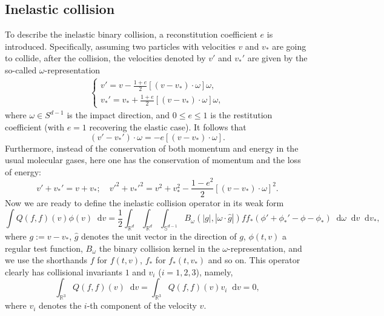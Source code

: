 \documentclass[review, times]{elsarticle}
\newcommand*\diff{\mathop{}\!\mathrm{d}}
\begin{document}
\subsection{Inelastic collision }
To describe the inelastic binary collision, a reconstitution coefficient $e$ is introduced. Specifically, assuming two particles with velocities $v$ and $v_*$ are going to collide, after the collision, the velocities denoted by $v'$ and $v_*'$ are given by the so-called $\omega$-representation \cite{vilani} 
\begin{align}\label{omega}
\left\{
\begin{array}{l}
\displaystyle v'=v-\frac{1+e}{2}[(v-v_*)\cdot \omega ]\omega, \\[8pt]
\displaystyle v_*'=v_*+\frac{1+e}{2}[(v-v_*)\cdot \omega]\omega,
\end{array}\right.
\end{align}
where $\omega \in S^{d-1}$ is the impact direction, and $0 \leq e \leq 1$ is the restitution coefficient (with $e=1$ recovering the elastic case). It follows that
\begin{equation}
(v'-v_*')\cdot \omega=-e [(v-v_*)\cdot \omega].
\end{equation}
Furthermore, instead of the conservation of both momentum and energy in the usual molecular gases, here one has the conservation of momentum and the loss of energy:
\begin{equation} \label{lossenergy}
v'+v_*'=v+v_*; \quad v'^2+v_*'^2=v^2+v_*^2-\frac{1-e^2}{2}[(v-v_*)\cdot \omega]^2.
\end{equation}
Now we are ready to define the inelastic collision operator in its weak form
\begin{equation} \label{col_omega}
\int Q(f,f)(v)\phi(v)\diff{v}= \frac{1}{2} \int_{\mathbb{R}^d} \int_{\mathbb{R}^d} \int_{\mathbb{S}^{d-1}} B_{\omega}(|g|,|\omega\cdot \hat{g}|)ff_*\left(\phi'+\phi_*'-\phi-\phi_* \right)\diff{\omega} \diff{v} \diff{v_*},
\end{equation}
where $g := v - v_\ast$, $\hat{g}$ denotes the unit vector in the direction of $g$, $\phi(t,v)$ a regular test function, $B_{\omega}$ the binary collision kernel in the $\omega$-representation, and we use the shorthands $f$ for $f(t,v)$, $f_\ast$ for $f_\ast(t, v_\ast)$ and so on. This operator clearly has collisional invariants $1$ and $v_i$ ($i = 1, 2, 3$), namely,
\begin{equation}
  \int_{\mathbb{R}^3} Q(f, f)(v) \diff v = \int_{\mathbb{R}^3} Q(f,f)(v)v_i\diff v = 0,
\end{equation}
where $v_i$ denotes the $i$-th component of the velocity $v$.
\end{document}
